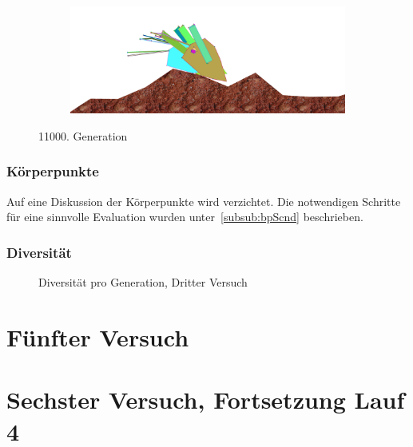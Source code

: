 \begin{figure}[H]
\begin{subfigure}[b]{0.45\textwidth}
            \includegraphics[width=\linewidth,center]{graphics/simulation-results/4_gen11000_4}
            \caption{\label{fig:gen11000_4}}
          \end{subfigure}
          \caption{11000. Generation\label{fig:gen11000}}
        \end{figure}

      \subsubsection{Körperpunkte}

        Auf eine Diskussion der Körperpunkte wird verzichtet.
        Die notwendigen Schritte für eine sinnvolle Evaluation wurden unter~\vref{subsub:bpScnd} beschrieben.

      \subsubsection{Diversität}

        \begin{figure}[H]
          \centering
          
          \caption{Diversität pro Generation, Dritter Versuch\label{fig:graphDivFourth}}
        \end{figure}

    \section{Fünfter Versuch}

    \section{Sechster Versuch, Fortsetzung Lauf 4\label{sec:sixthSimulation}}
